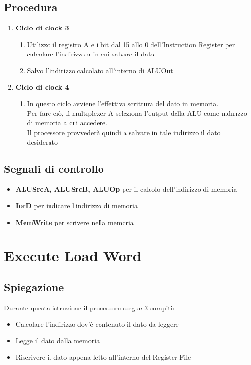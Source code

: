 \subsection{Procedura}
\begin{enumerate}
    \item[3.] \textbf{Ciclo di clock 3}
        \begin{enumerate}[label=\theenumi.\arabic*]
            \item [3.1] Utilizzo il registro A e i bit dal 15 allo 0 dell'Instruction Register per calcolare l'indirizzo a in cui salvare il dato
            \item [3.2] Salvo l'indirizzo calcolato all'interno di ALUOut
        \end{enumerate}
    \item [4.] \textbf{Ciclo di clock 4}
        \begin{enumerate} [label=\theenumi.\arabic*]
            \item [4.1] In questo ciclo avviene l'effettiva scrittura del dato in memoria.\\ Per fare ciò, il multiplexer A seleziona l'output della ALU come indirizzo di memoria a cui accedere.\\ Il processore provvederà quindi a salvare in tale indirizzo il dato desiderato
        \end{enumerate}
\end{enumerate}

\subsection{Segnali di controllo}
\begin{itemize}
    \item \textbf{ALUSrcA, ALUSrcB, ALUOp} per il calcolo dell'indirizzo di memoria
    \item \textbf{IorD} per indicare l'indirizzo di memoria
    \item \textbf{MemWrite} per scrivere nella memoria
\end{itemize}

\newpage

\section{Execute Load Word}
\subsection{Spiegazione}
Durante questa istruzione il processore esegue 3 compiti:
\begin{itemize}
    \item Calcolare l'indirizzo dov'è contenuto il dato da leggere
    \item Legge il dato dalla memoria
    \item Riscrivere il dato appena letto all'interno del Register File
\end{itemize}

